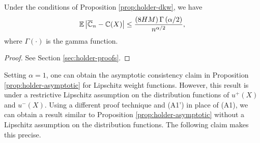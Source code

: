 \begin{corollary}
\label{cor:holder-dkw}
Under the conditions of Proposition \ref{prop:holder-dkw}, we have
$$
\mathbb{E} \left|\overline {\mathbb{C}}_n- \mathbb{C}(X) \right|  \le    \frac{\left(8HM\right) \Gamma\left(\alpha/2\right)}{n^{\alpha/2}},$$
where $\Gamma(\cdot)$ is the gamma function.
\end{corollary}

\begin{proof}
%
%
See Section \ref{sec:holder-proofs}.
\end{proof}


Setting $\alpha=1$, one can obtain the asymptotic consistency claim in Proposition \ref{prop:holder-asymptotic} for Lipschitz weight functions. However, this result is under  a restrictive Lipschitz assumption on the distribution functions of $u^+(X)$ and $u^-(X)$. Using a different proof technique and (A1') in place of (A1), we can obtain a result similar to Proposition \ref{prop:holder-asymptotic} without a Lipschitz assumption on the distribution functions. The following claim makes this precise.

